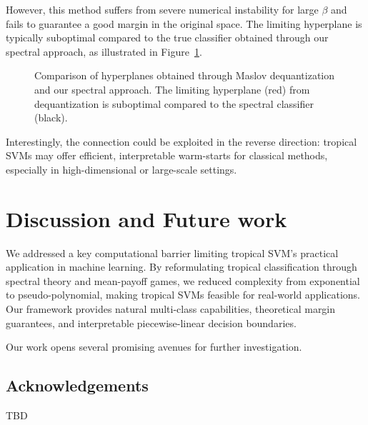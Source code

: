 \documentclass{article}
\begin{document}
However, this method suffers from severe numerical instability for large $\beta$ and fails to guarantee a good margin in the original space. The limiting hyperplane is typically suboptimal compared to the true classifier obtained through our spectral approach, as illustrated in Figure~\ref{fig:maslov_dequantization}.

\begin{figure}[h]
    \centering
    \resizebox{0.5\textwidth}{!}{\clipbox{0.15\width{} 0.15\height{} 0.15\width{} 0.15\height{}}{}}
    \caption{Comparison of hyperplanes obtained through Maslov dequantization and our spectral approach. The limiting hyperplane (red) from dequantization is suboptimal compared to the spectral classifier (black).}
    \label{fig:maslov_dequantization}
\end{figure}

Interestingly, the connection could be exploited in the reverse direction: tropical SVMs may offer efficient, interpretable warm-starts for classical methods, especially in high-dimensional or large-scale settings.

\section{Discussion and Future work}\label{sec:discussion}

We addressed a key computational barrier limiting tropical SVM's practical application in machine learning. By reformulating tropical classification through spectral theory and mean-payoff games, we reduced complexity from exponential to pseudo-polynomial, making tropical SVMs feasible for real-world applications. Our framework provides natural multi-class capabilities, theoretical margin guarantees, and interpretable piecewise-linear decision boundaries.

Our work opens several promising avenues for further investigation. 


\subsection*{Acknowledgements}

TBD
\end{document}

